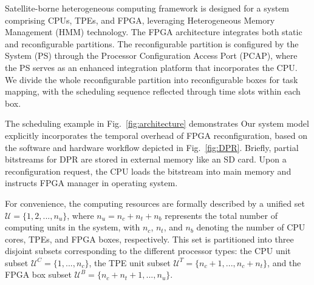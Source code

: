 \documentclass{IEEEtaes}
\begin{document}
Satellite-borne heterogeneous computing framework is designed for a system comprising CPUs, TPEs, and FPGA, leveraging Heterogeneous Memory Management (HMM)\cite{b36} technology. The FPGA architecture integrates both static and reconfigurable partitions. The reconfigurable partition is configured by the  System (PS) through the Processor Configuration Access Port (PCAP), where the PS serves as an enhanced integration platform that incorporates the CPU. We divide the whole reconfigurable partition into reconfigurable boxes for task mapping, with the scheduling sequence reflected through time slots within each box.

The scheduling example in Fig.~\ref{fig:architecture} demonstrates  Our system model explicitly incorporates the temporal overhead of FPGA reconfiguration, based on the software and hardware workflow depicted in Fig.~\ref{fig:DPR}. Briefly, partial bitstreams for DPR are stored in external memory like an SD card. Upon a reconfiguration request, the CPU loads the bitstream into main memory and instructs FPGA manager in operating system. 

For convenience, the computing resources are formally described by a unified set $\mathcal{U} = \{1, 2, ..., n_u\}$, where $n_u=n_c+n_t+n_b$ represents the total number of computing units in the system, with $n_c$, $n_t$, and $n_b$ denoting the number of CPU cores, TPEs, and FPGA boxes, respectively. This set is partitioned into three disjoint subsets corresponding to the different processor types: the CPU unit subset $\mathcal{U}^C = \{1, ..., n_c\}$, the TPE unit subset $\mathcal{U}^T = \{n_c+1, ..., n_c+n_t\}$, and the FPGA box subset $\mathcal{U}^B = \{n_c+n_t+1, ..., n_u\}$.
\end{document}
